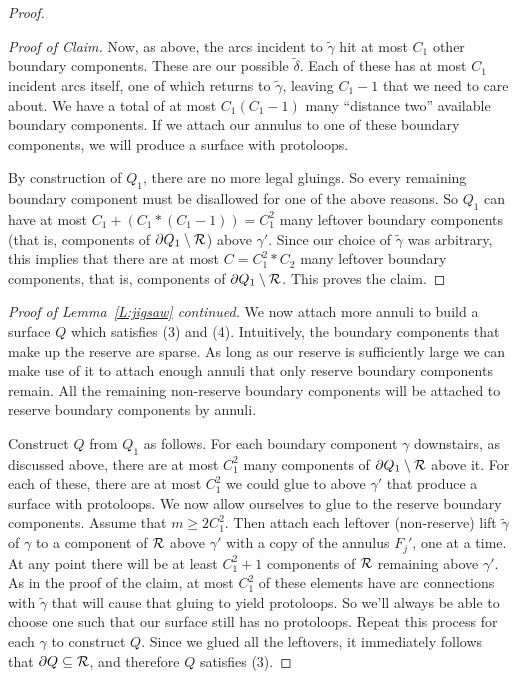 \begin{proof}
\begin{proof}[Proof of Claim]
Now, as above, the arcs incident to $\widetilde{\gamma}$ hit at most $C_1$
other boundary components. These are our possible $\widetilde{\delta}$. Each of
these has at most $C_1$ incident arcs itself, one of which returns to
$\widetilde{\gamma}$, leaving $C_1-1$ that we need to care about. We have
a total of at most $C_1(C_1-1)$ many ``distance two'' available boundary
components.  If we attach our annulus to one of these boundary components, we
will produce a surface with protoloops.

By construction of $Q_1$, there are no more legal gluings. So every remaining
boundary component must be disallowed for one of the above reasons. So $Q_1$
can have at most $C_1+(C_1*(C_1-1)) = C_1^2$ many leftover boundary components
(that is, components of $\partial Q_1 \setminus \mathcal{R}$) above $\gamma'$.  Since our
choice of $\widetilde{\gamma}$ was arbitrary, this implies that there are at
most $C = C_1^2*C_2$ many leftover boundary components, that is, components of
$\partial Q_1\setminus\mathcal{R}$. This proves the claim.

\end{proof}

\noindent \emph{Proof of Lemma~\ref{L:jigsaw} continued.} We now attach more
annuli to build a surface $Q$ which satisfies (3) and (4). Intuitively, the
boundary components that make up the reserve are sparse. As long as our reserve
is sufficiently large we can make use of it to attach enough annuli that only
reserve boundary components remain. All the remaining non-reserve boundary
components will be attached to reserve boundary components by annuli.

Construct $Q$ from $Q_1$ as follows.  For each boundary component $\gamma$
downstairs, as discussed above, there are at most $C_1^2$ many components of
$\partial Q_1 \setminus \mathcal{R}$ above it.  For each of these, there are at most $C_1^2$
we could glue to above $\gamma'$ that produce a surface with protoloops. We now
allow ourselves to glue to the reserve boundary components. Assume that $m\geq
2C_1^2$.  Then attach each leftover (non-reserve) lift $\widetilde{\gamma}$ of
$\gamma$ to a component of $\mathcal{R}$ above $\gamma'$ with a copy of the annulus
$F_j'$, one at a time.  At any point there will be at least $C_1^2+1$
components of $\mathcal{R}$ remaining above $\gamma'$. As in the proof of the claim, at
most $C_1^2$ of these elements have arc connections with $\widetilde{\gamma}$
that will cause that gluing to yield protoloops. So we'll always be able to
choose one such that our surface still has no protoloops.  Repeat this process
for each $\gamma$ to construct $Q$.  Since we glued all the leftovers, it
immediately follows that $\partial Q \subseteq \mathcal{R}$, and therefore $Q$ satisfies (3).


\end{proof}
